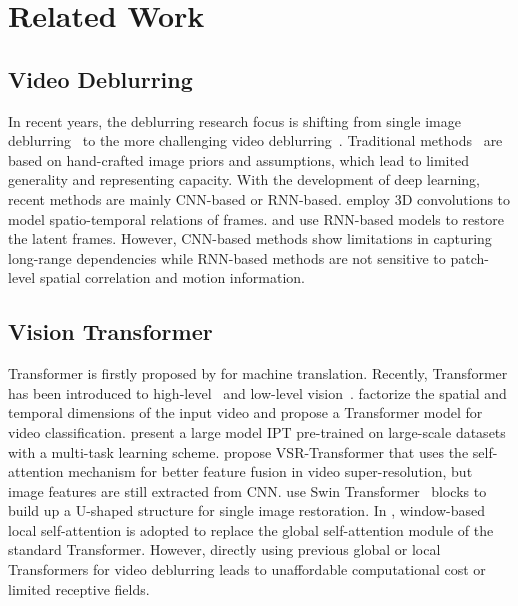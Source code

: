 \documentclass{article}
\begin{document}
\section{Related Work}
\label{related_work}
	\subsection{Video Deblurring}
In recent years, the deblurring research focus is shifting from single image deblurring~\cite{zoran2011learning,chakrabarti2016neural,purohit2020region} to the more challenging video deblurring~\cite{real_blur,matsushita2006full}. Traditional methods~\cite{li2010generating,zhang2013multi} are based on hand-crafted image priors and assumptions, which lead to limited generality and representing capacity. With the development of deep learning, recent methods are mainly CNN-based or RNN-based. \cite{dblrnet} employ 3D convolutions to model spatio-temporal relations of frames. \cite{hyun2017online} and \cite{Nah} use RNN-based models to restore the latent frames. However, CNN-based methods show limitations in capturing long-range dependencies while RNN-based methods are not sensitive to patch-level spatial correlation and  motion information. 

\subsection{Vision Transformer}
Transformer is firstly proposed by \cite{vaswani2017attention} for machine translation. Recently, Transformer has been introduced to high-level~\cite{global_msa,liu2021swin,de_detr,SETR,xcit,to_1,prtr,tc_2,tc_3,rsn} and low-level vision~\cite{ipt,cai2021mask,uformer,vsrt,cai2021learning,hu2021pseudo}. \cite{arnab2021vivit} factorize the spatial and temporal dimensions of the input video and propose a Transformer model for video classification. \cite{ipt} present a large model IPT pre-trained on large-scale datasets with a multi-task learning scheme. \cite{vsrt} propose VSR-Transformer that uses the self-attention mechanism for better feature fusion in video super-resolution, but image features are still extracted from CNN. \cite{uformer} use Swin Transformer~\cite{liu2021swin} blocks to build up a U-shaped structure for single image restoration.  In \cite{vaswani2021scaling,cao2021swin,liu2021swin}, window-based local self-attention is adopted to replace the global self-attention module of the standard Transformer. However, directly using previous global or local Transformers for video deblurring leads to unaffordable computational cost or limited receptive fields. 
\end{document}

